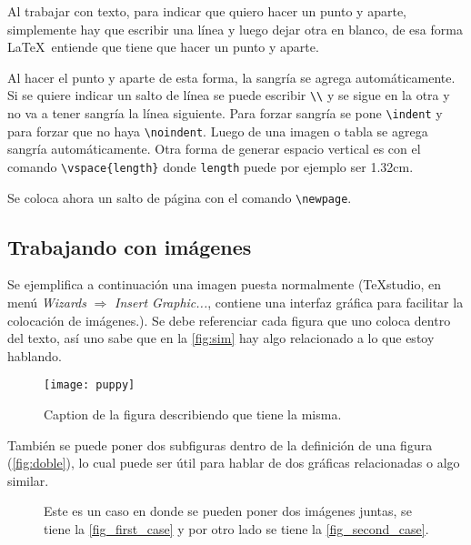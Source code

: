 \documentclass[a4paper,12pt]{article} %
\begin{document}
	Al trabajar con texto, para indicar que quiero hacer un punto y aparte, simplemente hay que escribir una línea y luego dejar otra en blanco, de esa forma \LaTeX ~entiende que tiene que hacer un punto y aparte. 


	Al hacer el punto y aparte de esta forma, la sangría se agrega automáticamente. Si se quiere indicar un salto de línea se puede escribir \verb|\\| y se sigue en la otra y no va a tener sangría la línea siguiente. Para forzar sangría se pone \verb|\indent| y para forzar que no haya \verb|\noindent|. Luego de una imagen o tabla se agrega sangría automáticamente. Otra forma de generar espacio vertical es con el comando \verb|\vspace{length}| donde \verb|length| puede por ejemplo ser 1.32cm.
	
	\vspace{1.32cm}
	
	Se coloca ahora un salto de página con el comando \verb|\newpage|.
	
	\newpage
	

\subsection{Trabajando con imágenes}

	Se ejemplifica a continuación una imagen puesta normalmente (TeXstudio, en menú \textit{Wizards} $ \Longrightarrow $ \textit{Insert Graphic...}, contiene una interfaz gráfica para facilitar la colocación de imágenes.). Se debe referenciar cada figura que uno coloca dentro del texto, así uno sabe que en la \autoref{fig:sim}  hay algo relacionado a lo que estoy hablando.
	\begin{figure}[h!]
	\centering
	\texttt{[image: puppy]}
	\caption{Caption de la figura describiendo que tiene la misma.}
	\label{fig:sim}
	\end{figure}
	
	También se puede poner dos subfiguras dentro de la definición de una figura (\autoref{fig:doble}), lo cual puede ser útil para hablar de dos gráficas relacionadas o algo similar. 
	\begin{figure}[h!]
	\centering
	\hfil
	\caption{Este es un caso en donde se pueden poner dos imágenes juntas, se tiene la \autoref{fig_first_case} y por otro lado se tiene la \autoref{fig_second_case}.}
	\label{fig:doble}
	\end{figure}
	
\end{document}

